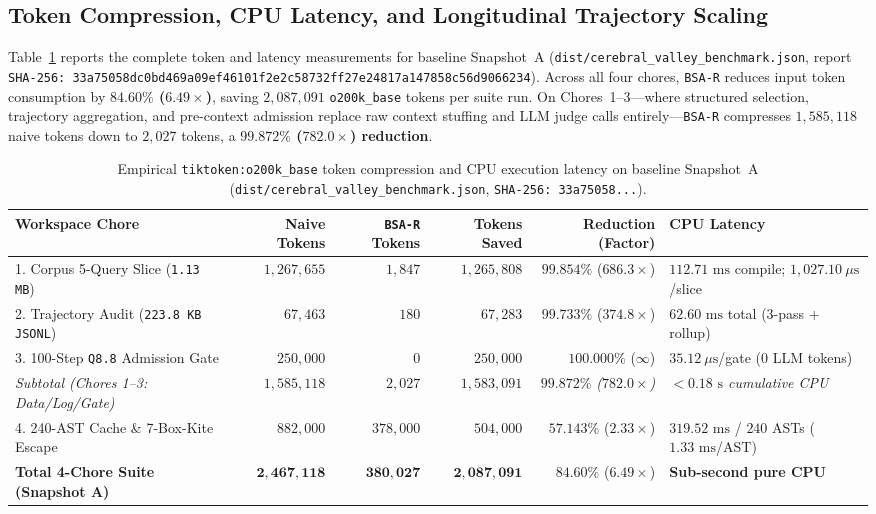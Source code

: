 \documentclass[11pt]{article}
\theoremstyle{plain}
\theoremstyle{definition}
\begin{document}
\subsection{Token Compression, CPU Latency, and Longitudinal Trajectory Scaling}

Table~\ref{tab:main_bench} reports the complete token and latency measurements for baseline Snapshot~A (\texttt{dist/cerebral\_valley\_benchmark.json}, report \texttt{SHA-256: 33a75058dc0bd469a09ef46101f2e2c58732ff27e24817a147858c56d9066234}). Across all four chores, \texttt{BSA-R} reduces input token consumption by \textbf{$84.60\%$ ($6.49\times$)}, saving $2{,}087{,}091$ \texttt{o200k\_base} tokens per suite run. On Chores~1--3---where structured selection, trajectory aggregation, and pre-context admission replace raw context stuffing and LLM judge calls entirely---\texttt{BSA-R} compresses $1{,}585{,}118$ naive tokens down to $2{,}027$ tokens, a \textbf{$99.872\%$ ($782.0\times$) reduction}.

\begin{table}[htbp]
\centering
\caption{Empirical \texttt{tiktoken:o200k\_base} token compression and CPU execution latency on baseline Snapshot~A (\texttt{dist/cerebral\_valley\_benchmark.json}, \texttt{SHA-256: 33a75058...}).}\label{tab:main_bench}
\vspace{4pt}
\small
\begin{tabular}{@{}lrrrrl@{}}
\toprule
Workspace Chore & Naive Tokens & \texttt{BSA-R} Tokens & Tokens Saved & Reduction (Factor) & CPU Latency \\
\midrule
1. Corpus 5-Query Slice (\texttt{1.13 MB}) & $1{,}267{,}655$ & $1{,}847$ & $1{,}265{,}808$ & $99.854\%$ ($686.3\times$) & $112.71\text{ ms}$ compile; $1{,}027.10~\mu\text{s}$/slice \\
2. Trajectory Audit (\texttt{223.8 KB JSONL}) & $67{,}463$ & $180$ & $67{,}283$ & $99.733\%$ ($374.8\times$) & $62.60\text{ ms}$ total (3-pass + rollup) \\
3. 100-Step \texttt{Q8.8} Admission Gate & $250{,}000$ & $0$ & $250{,}000$ & $100.000\%$ ($\infty$) & $35.12~\mu\text{s}$/gate ($0$ LLM tokens) \\
\midrule
\emph{Subtotal (Chores 1--3: Data/Log/Gate)} & \emph{$1{,}585{,}118$} & \emph{$2{,}027$} & \emph{$1{,}583{,}091$} & \emph{$99.872\%$ ($782.0\times$)} & \emph{$< 0.18\text{ s}$ cumulative CPU} \\
4. 240-AST Cache \& 7-Box-Kite Escape & $882{,}000$ & $378{,}000$ & $504{,}000$ & $57.143\%$ ($2.33\times$) & $319.52\text{ ms}$ / $240$ ASTs ($1.33\text{ ms}$/AST) \\
\midrule
\textbf{Total 4-Chore Suite (Snapshot A)} & $\mathbf{2{,}467{,}118}$ & $\mathbf{380{,}027}$ & $\mathbf{2{,}087{,}091}$ & $\mathbf{84.60\%}$ ($\mathbf{6.49\times}$) & \textbf{Sub-second pure CPU} \\
\bottomrule
\end{tabular}
\end{table}
\end{document}
